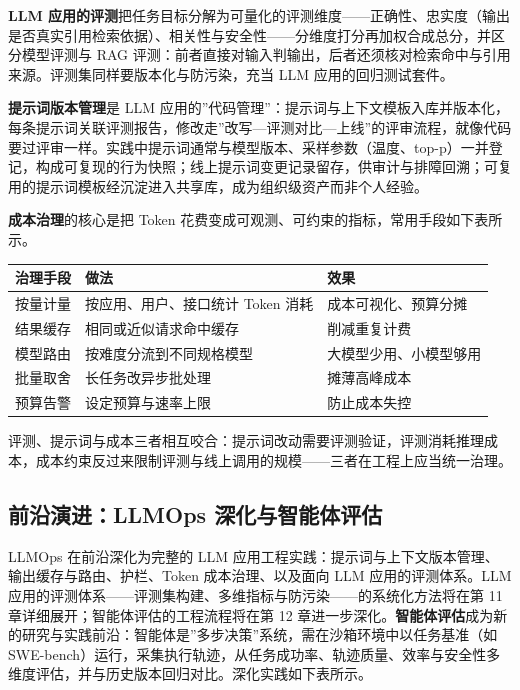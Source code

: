 \documentclass[12pt,a4paper,twoside,openany]{ctexbook}
\numberwithin{figure}{chapter}
\numberwithin{table}{chapter}
\newcounter{none}
\begin{document}
\textbf{LLM
应用的评测}把任务目标分解为可量化的评测维度------正确性、忠实度（输出是否真实引用检索依据）、相关性与安全性------分维度打分再加权合成总分，并区分模型评测与
RAG
评测：前者直接对输入判输出，后者还须核对检索命中与引用来源。评测集同样要版本化与防污染，充当
LLM 应用的回归测试套件。

\textbf{提示词版本管理}是 LLM
应用的''代码管理''：提示词与上下文模板入库并版本化，每条提示词关联评测报告，修改走''改写---评测对比---上线''的评审流程，就像代码要过评审一样。实践中提示词通常与模型版本、采样参数（温度、top-p）一并登记，构成可复现的行为快照；线上提示词变更记录留存，供审计与排障回溯；可复用的提示词模板经沉淀进入共享库，成为组织级资产而非个人经验。

\textbf{成本治理}的核心是把 Token
花费变成可观测、可约束的指标，常用手段如下表所示。

{\def\LTcaptype{none} %
\begin{longtable}[]{@{}lll@{}}
\toprule\noalign{}
治理手段 & 做法 & 效果 \\
\midrule\noalign{}
\endhead
\bottomrule\noalign{}
\endlastfoot
按量计量 & 按应用、用户、接口统计 Token 消耗 & 成本可视化、预算分摊 \\
结果缓存 & 相同或近似请求命中缓存 & 削减重复计费 \\
模型路由 & 按难度分流到不同规格模型 & 大模型少用、小模型够用 \\
批量取舍 & 长任务改异步批处理 & 摊薄高峰成本 \\
预算告警 & 设定预算与速率上限 & 防止成本失控 \\
\end{longtable}
}

评测、提示词与成本三者相互咬合：提示词改动需要评测验证，评测消耗推理成本，成本约束反过来限制评测与线上调用的规模------三者在工程上应当统一治理。

\subsection{前沿演进：LLMOps
深化与智能体评估}\label{ux524dux6cbfux6f14ux8fdbllmops-ux6df1ux5316ux4e0eux667aux80fdux4f53ux8bc4ux4f30}

LLMOps 在前沿深化为完整的 LLM
应用工程实践：提示词与上下文版本管理、输出缓存与路由、护栏、Token
成本治理、以及面向 LLM 应用的评测体系。LLM
应用的评测体系------评测集构建、多维指标与防污染------的系统化方法将在第
11 章详细展开；智能体评估的工程流程将在第 12
章进一步深化。\textbf{智能体评估}成为新的研究与实践前沿：智能体是''多步决策''系统，需在沙箱环境中以任务基准（如
SWE-bench）运行，采集执行轨迹，从任务成功率、轨迹质量、效率与安全性多维度评估，并与历史版本回归对比。深化实践如下表所示。
\end{document}
